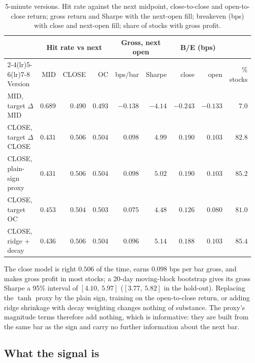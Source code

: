 \documentclass[11pt,a4paper]{article}
\begin{document}
\begin{table}[htbp]
\centering
\caption{5-minute versions. Hit rate against the next midpoint, close-to-close and open-to-close
return; gross return and Sharpe with the next-open fill; breakeven (bps) with close and next-open fill;
share of stocks with gross profit.}
\label{tab:var5}
\footnotesize
\setlength{\tabcolsep}{3pt}
\begin{tabular}{@{}lrrrrrrrr@{}}
\toprule
& \multicolumn{3}{c}{Hit rate vs next} & \multicolumn{2}{c}{Gross, next open} & \multicolumn{2}{c}{B/E (bps)} & \\
\cmidrule(lr){2-4}\cmidrule(lr){5-6}\cmidrule(lr){7-8}
Version & MID & CLOSE & OC & bps/bar & Sharpe & close & open & \% stocks \\
\midrule
MID, target $\Delta$MID & $0.689$ & $0.490$ & $0.493$ & $-0.138$ & $-4.14$ & $-0.243$ & $-0.133$ & $7.0$ \\
CLOSE, target $\Delta$CLOSE & $0.431$ & $0.506$ & $0.504$ & $0.098$ & $4.99$ & $0.190$ & $0.103$ & $82.8$ \\
CLOSE, plain-sign proxy & $0.431$ & $0.506$ & $0.504$ & $0.098$ & $5.02$ & $0.190$ & $0.103$ & $85.2$ \\
CLOSE, target OC & $0.453$ & $0.504$ & $0.503$ & $0.075$ & $4.48$ & $0.126$ & $0.080$ & $81.0$ \\
CLOSE, ridge + decay & $0.436$ & $0.506$ & $0.504$ & $0.096$ & $5.14$ & $0.188$ & $0.103$ & $85.4$ \\
\bottomrule
\end{tabular}
\end{table}

The close model is right $0.506$ of the time, earns $0.098$ bps per bar gross, and makes gross profit
in most stocks; a 20-day moving-block bootstrap gives its gross Sharpe a 95\% interval of $[4.10,\ 5.97]$ ($[3.77,\ 5.82]$ in the hold-out). Replacing the $\tanh$ proxy by the plain sign, training on the open-to-close return, or
adding ridge shrinkage with decay weighting changes nothing of substance. The proxy's magnitude terms therefore add nothing, which is informative: they are built from the same bar as the sign and carry no
further information about the next bar.

\subsection{What the signal is}
\label{sec:signal}
\end{document}
